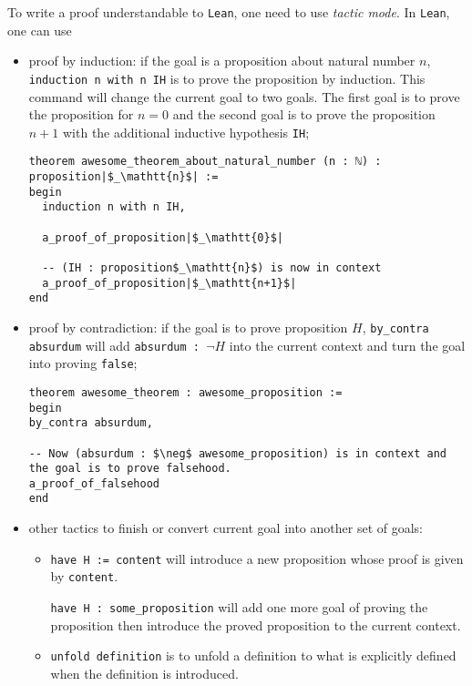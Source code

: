 \documentclass{report}
\theoremstyle{definition}
\theoremstyle{plain}
\begin{document}
To write a proof understandable to {\tt Lean}, one need to use {\it tactic mode}. In {\tt Lean}, one can use
\begin{itemize}
  \item proof by induction: if the goal is a proposition about natural number $n$, {\tt induction n with n IH} is to prove the proposition by induction. This command will change the current goal to two goals. The first goal is to prove the proposition for $n=0$ and the second goal is to prove the proposition $n+1$ with the additional inductive hypothesis {\tt IH};

\begin{verbatim}
theorem awesome_theorem_about_natural_number (n : ℕ) : proposition|$_\mathtt{n}$| :=
begin
  induction n with n IH,

  a_proof_of_proposition|$_\mathtt{0}$|

  -- (IH : proposition$_\mathtt{n}$) is now in context
  a_proof_of_proposition|$_\mathtt{n+1}$|
end
\end{verbatim}

  \item proof by contradiction: if the goal is to prove proposition $H$, {\tt by\_contra absurdum} will add {\tt absurdum : $\neg H$} into the current context and turn the goal into proving {\tt false};

\begin{verbatim}
theorem awesome_theorem : awesome_proposition :=
begin
by_contra absurdum,

-- Now (absurdum : $\neg$ awesome_proposition) is in context and the goal is to prove falsehood.
a_proof_of_falsehood
end
\end{verbatim}

  \item other tactics to finish or convert current goal into another set of goals:
  \begin{itemize}
    \item {\tt have H := content} will introduce a new proposition whose proof is given by {\tt content}.
    
    {\tt have H : some\_proposition} will add one more goal of proving the proposition then introduce the proved proposition to the current context.
  
    \item {\tt unfold definition} is to unfold a definition to what is explicitly defined when the definition is introduced.
  

\end{itemize}
\end{itemize}
\end{document}
